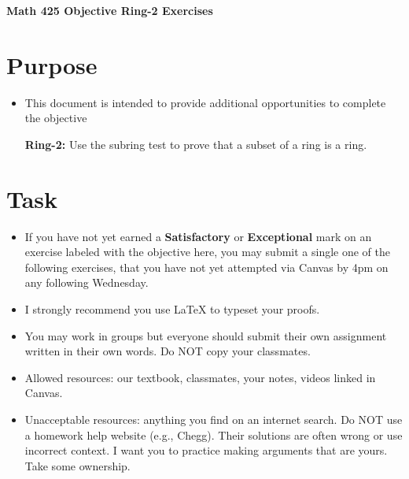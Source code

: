 \documentclass[12pt]{article}
\begin{document}
	\begin{center}
		{\Large \bf Math 425 Objective Ring-2 Exercises}
	\end{center}
	\section*{Purpose}
	\begin{itemize}
		\item This document is intended to provide additional opportunities to complete the objective
		
		\textbf{Ring-2:} Use the subring test to prove that a subset of a ring is a ring.
	\end{itemize}
	\section*{Task}
	\begin{itemize}
		\item If you have not yet earned a \textbf{Satisfactory} or \textbf{Exceptional} mark on an exercise labeled with the objective here, you may submit a single one of the following exercises, that you have not yet attempted via Canvas by 4pm on any following Wednesday.
		\item I strongly recommend you use LaTeX to typeset your proofs.
		\item You may work in groups but everyone should submit their own assignment written in their own words.  Do NOT copy your classmates.
		\item Allowed resources: our textbook, classmates, your notes, videos linked in Canvas.
		\item Unacceptable resources: anything you find on an internet search. Do NOT use a homework help website (e.g., Chegg). Their solutions are often wrong or use incorrect context.  I want you to practice making arguments that are yours. Take some ownership.
	\end{itemize}
\end{document}
